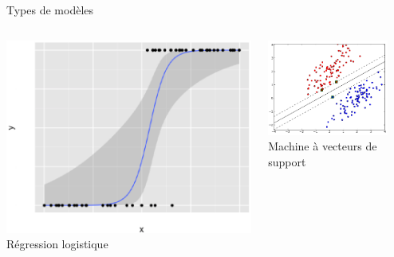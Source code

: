 \documentclass[compress]{beamer}
\begin{document}
\begin{frame}{Types de modèles}
  \begin{adjustwidth}{-2.5em}{-2.5em}
  \begin{columns}
    \begin{column}{0.33\textwidth}
      \centering
      \includegraphics[width=\textwidth]{resources/logreg}
      \\{\footnotesize Régression logistique}
    \end{column}
    \begin{column}{0.33\textwidth}
      \centering
      \includegraphics[width=0.85\textwidth]{resources/lsvm}\\
      {\footnotesize Machine à vecteurs de support}
    \end{column}

\end{columns}
\end{adjustwidth}
\end{frame}
\end{document}
